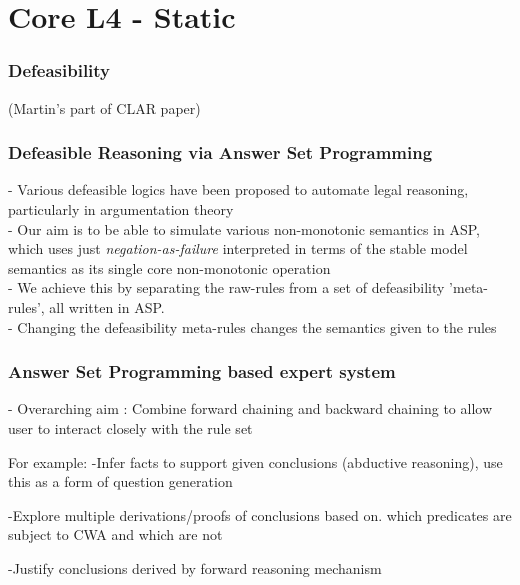 \documentclass{beamer}
\begin{document}
\section{Core L4 - Static}


\begin{frame}[fragile]\frametitle{Defeasibility}

  (Martin's part of CLAR paper)

\end{frame}

\begin{frame}[fragile]\frametitle{Defeasible Reasoning via Answer Set Programming} 

 - Various defeasible logics have been proposed to automate legal reasoning, particularly in argumentation theory\\
 
 - Our aim is to be able to simulate various non-monotonic semantics in ASP, which uses just \textit{negation-as-failure} interpreted in terms of the stable model semantics as its single core non-monotonic operation\\
 
 
 - We achieve this by separating the raw-rules from a set of defeasibility 'meta-rules', all written in ASP.\\
 
 - Changing the defeasibility meta-rules changes the semantics given to the rules

\end{frame}

\begin{frame}[fragile]\frametitle{Answer Set Programming based expert system}

- Overarching aim : Combine forward chaining and backward chaining to allow user to interact closely with the rule set

For example:
-Infer facts to support given conclusions (abductive reasoning), use this as a form of question generation

-Explore multiple derivations/proofs of conclusions based on. which predicates are subject to CWA and which are not

-Justify conclusions derived by forward reasoning mechanism


\end{frame}
\end{document}
